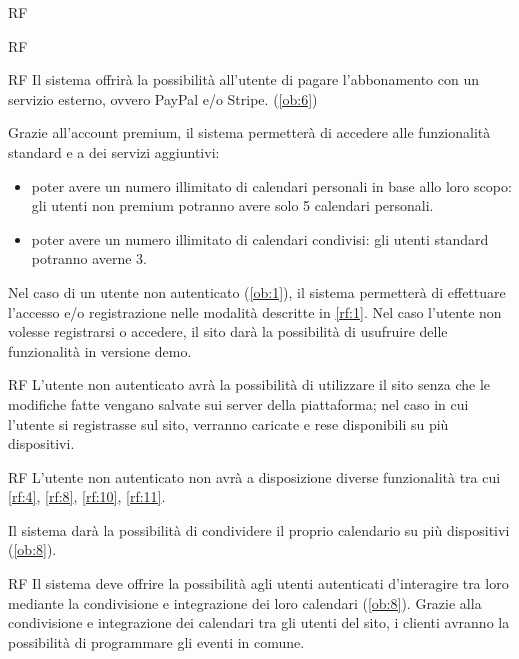 \begin {listaPersonale}{RF}
\begin {listaPersonale2}{RF}
\begin {listaPersonale3}{RF}
Il sistema offrirà la possibilità all'utente di pagare l'abbonamento con un servizio esterno, ovvero PayPal e/o Stripe. (\ref{ob:6})


Grazie all'account premium, il sistema permetterà di accedere alle funzionalità standard e a dei servizi aggiuntivi:
\begin{itemize}
    \item poter avere un numero illimitato di calendari personali in base allo loro scopo: gli utenti non premium potranno avere solo 5 calendari personali.
    \item poter avere un numero illimitato di calendari condivisi: gli utenti standard potranno averne 3.
\end{itemize}


\end {listaPersonale3}
\end {listaPersonale2}

Nel caso di un utente non autenticato (\ref{ob:1}), il sistema permetterà di effettuare l'accesso e/o registrazione nelle modalità descritte in \ref{rf:1}. Nel caso l'utente non volesse registrarsi o accedere, il sito darà la possibilità di usufruire delle funzionalità in versione demo.

\begin{listaPersonale2}{RF}
    L'utente non autenticato avrà la possibilità di utilizzare il sito senza che le modifiche
    fatte vengano salvate sui server della piattaforma; nel caso in cui l'utente si registrasse sul sito, verranno caricate e rese disponibili su più dispositivi.

\begin{listaPersonale3}{RF}
    L'utente non autenticato non avrà a disposizione diverse funzionalità tra cui \ref{rf:4}, \ref{rf:8}, \ref{rf:10}, \ref{rf:11}.
\end{listaPersonale3}
\end{listaPersonale2}

Il sistema darà la possibilità di condividere il proprio calendario su più dispositivi (\ref{ob:8}).

\begin{listaPersonale2}{RF}
Il sistema deve offrire la possibilità agli utenti autenticati d'interagire tra loro 
mediante la condivisione e integrazione dei loro calendari (\ref{ob:8}). 
Grazie alla condivisione e integrazione dei calendari tra gli utenti del sito, i clienti avranno la possibilità di programmare gli eventi in comune.
\end{listaPersonale2}


\end{listaPersonale}
